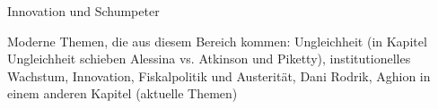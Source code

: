 \textcite{Aghion1992} Innovation und Schumpeter






Moderne Themen, die aus diesem Bereich kommen: Ungleichheit (in Kapitel Ungleichheit schieben Alessina vs. Atkinson und Piketty), institutionelles Wachstum, Innovation, Fiskalpolitik und Austerität, Dani Rodrik, Aghion in einem anderen Kapitel (aktuelle Themen)









